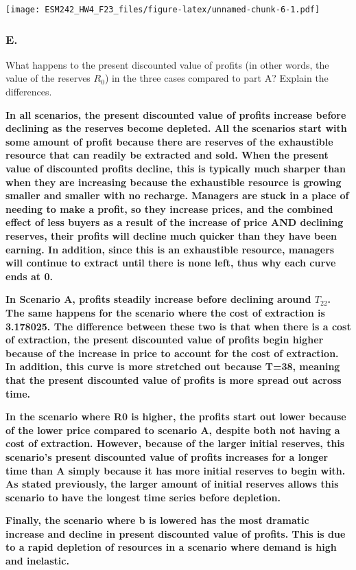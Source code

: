 \documentclass[
]{article}
\begin{document}
\texttt{[image: ESM242\_HW4\_F23\_files/figure-latex/unnamed-chunk-6-1.pdf]}

\hypertarget{e.}{%
\subsubsection{E.}\label{e.}}

What happens to the present discounted value of profits (in other words,
the value of the reserves \(R_0\)) in the three cases compared to part
A? Explain the differences.

\textbf{In all scenarios, the present discounted value of profits
increase before declining as the reserves become depleted. All the
scenarios start with some amount of profit because there are reserves of
the exhaustible resource that can readily be extracted and sold. When
the present value of discounted profits decline, this is typically much
sharper than when they are increasing because the exhaustible resource
is growing smaller and smaller with no recharge. Managers are stuck in a
place of needing to make a profit, so they increase prices, and the
combined effect of less buyers as a result of the increase of price AND
declining reserves, their profits will decline much quicker than they
have been earning. In addition, since this is an exhaustible resource,
managers will continue to extract until there is none left, thus why
each curve ends at 0.}

{\textbf{In Scenario A, profits steadily increase before declining
around \(T_22\). The same happens for the scenario where the cost of
extraction is 3.178025. The difference between these two is that when
there is a cost of extraction, the present discounted value of profits
begin higher because of the increase in price to account for the cost of
extraction. In addition, this curve is more stretched out because T=38,
meaning that the present discounted value of profits is more spread out
across time. }}

{\textbf{In the scenario where R0 is higher, the profits start out lower
because of the lower price compared to scenario A, despite both not
having a cost of extraction. However, because of the larger initial
reserves, this scenario's present discounted value of profits increases
for a longer time than A simply because it has more initial reserves to
begin with. As stated previously, the larger amount of initial reserves
allows this scenario to have the longest time series before depletion.}}

{\textbf{Finally, the scenario where b is lowered has the most dramatic
increase and decline in present discounted value of profits. This is due
to a rapid depletion of resources in a scenario where demand is high and
inelastic.}}
\end{document}
